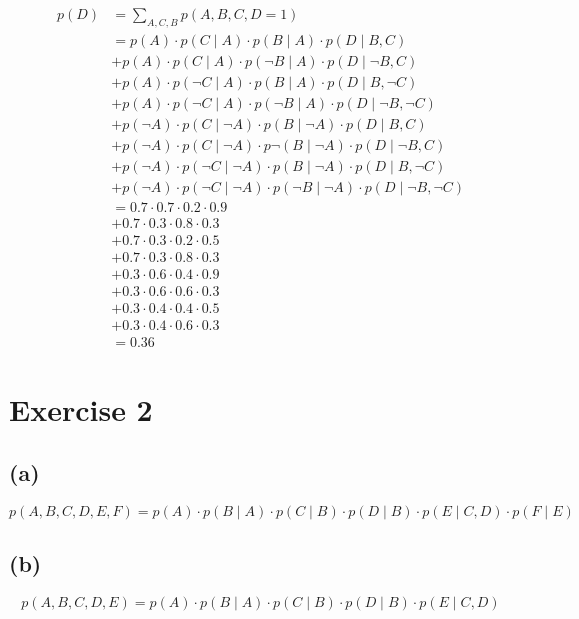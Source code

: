 \documentclass{article}
\begin{document}
\begin{align*}
p(D)    &= \sum_{A,C,B} p(A,B,C, D=1)\\
        &= p(A) \cdot p(C \mid A) \cdot p(B \mid A) \cdot p(D \mid B,C)\\
        &+ p(A) \cdot p(C \mid A) \cdot p(\neg B \mid A) \cdot p( D \mid \neg B,C) \\
        &+ p(A) \cdot p(\neg C \mid A) \cdot p(B \mid A) \cdot p(D \mid B,\neg C) \\
        &+ p(A) \cdot p(\neg C \mid A) \cdot p(\neg B \mid A) \cdot p( D \mid \neg B,\neg C) \\
        &+ p(\neg A) \cdot p(C \mid \neg A) \cdot p(B \mid \neg A) \cdot p(D \mid B,C) \\
        &+ p(\neg A) \cdot p(C \mid \neg A) \cdot p\neg (B \mid \neg A) \cdot p(D \mid \neg B,C) \\
        &+ p(\neg A) \cdot p(\neg C \mid \neg A) \cdot p(B \mid \neg A) \cdot p(D \mid B,\neg C) \\
        &+ p(\neg A) \cdot p(\neg C \mid \neg A) \cdot p(\neg B \mid \neg A) \cdot p(D \mid \neg B,\neg C) \\
        &= 0.7 \cdot 0.7 \cdot 0.2 \cdot 0.9 \\
        &+ 0.7 \cdot 0.3 \cdot 0.8 \cdot 0.3 \\
        &+ 0.7 \cdot 0.3\cdot 0.2 \cdot 0.5 \\
        &+ 0.7 \cdot 0.3 \cdot 0.8 \cdot 0.3 \\
        &+ 0.3 \cdot 0.6 \cdot 0.4 \cdot 0.9 \\
        &+ 0.3 \cdot 0.6 \cdot 0.6\cdot 0.3 \\
        &+ 0.3 \cdot 0.4 \cdot 0.4 \cdot 0.5 \\
        &+ 0.3 \cdot 0.4 \cdot 0.6 \cdot 0.3 \\
        &= 0.36
\end{align*}



\section*{Exercise 2}
\subsection*{(a)}
\[
  p(A, B, C, D, E, F ) = p(A) \cdot p(B \mid A) \cdot p(C \mid B) \cdot p(D \mid B) \cdot p(E \mid C,D) \cdot p(F \mid E)
\]

\subsection*{(b)}
\[
p(A, B, C, D, E ) = p(A) \cdot p(B \mid A) \cdot p(C \mid B) \cdot p(D \mid B) \cdot p(E \mid C,D) 
\]
\end{document}
